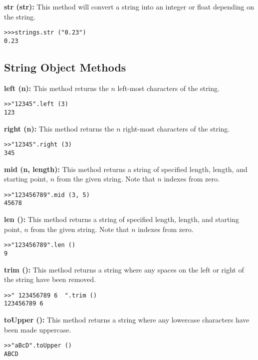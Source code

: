 \colorbox{blue!10}{\bf str (str):} This method will convert a string into an integer or float depending on the string.

\begin{lstlisting}
>>>strings.str ("0.23")
0.23
\end{lstlisting}


\subsection*{String Object Methods}


\colorbox{blue!10}{\bf left (n):} This method returns the $n$ left-most characters of the string.

\begin{lstlisting}
>>"12345".left (3)
123
\end{lstlisting}


\colorbox{blue!10}{\bf right (n):} This method returns the $n$ right-most characters of the string.

\begin{lstlisting}
>>"12345".right (3)
345
\end{lstlisting}


\colorbox{blue!10}{\bf mid (n, length):} This method returns a string of specified length, length, and starting point, $n$ from the given string. Note that $n$ indexes from zero.

\begin{lstlisting}
>>"123456789".mid (3, 5)
45678
\end{lstlisting}


\colorbox{blue!10}{\bf len ():} This method returns a string of specified length, length, and starting point, $n$ from the given string. Note that $n$ indexes from zero.

\begin{lstlisting}
>>"123456789".len ()
9
\end{lstlisting}


\colorbox{blue!10}{\bf trim ():} This method returns a string where any spaces on the left or right of the string have been removed.

\begin{lstlisting}
>>" 123456789 6  ".trim ()
123456789 6
\end{lstlisting}


\colorbox{blue!10}{\bf toUpper ():}  This method returns a string where any lowercase characters have been made uppercase.

\begin{lstlisting}
>>"aBcD".toUpper ()
ABCD
\end{lstlisting}
%

